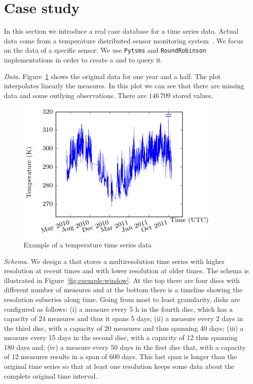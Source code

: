 
\section{Case study}
\label{sec:example}

In this section we introduce a real case database for a time series
data. Actual data come from a temperature distributed sensor
monitoring system~\cite{alippi10}. We focus on the data of a specific
sensor. We use \texttt{Pytsms} and \texttt{RoundRobinson}
implementations in order to create a  and to query it.

\emph{Data}. Figure~\ref{fig:exemple:original} shows the original
data for one year and a half. The plot interpolates linearly the
measures. In this plot we can see that there are missing data and some
outlying observations. There are $146\,709$ stored values.

\begin{figure}[tp]
  \centering
  \includegraphics{fig_exemple_original.pdf}
  \caption{Example of a temperature time series data}
  \label{fig:exemple:original}
\end{figure}

\emph{Schema}. We design a  that stores a multiresolution
time series with higher resolution at recent times and with lower
resolution at older times. The schema is illustrated in 
Figure~\ref{fig:exemple:window}. At the top there are four discs with
different number of measures and at the bottom there is a timeline
showing the resolution subseries along time. 
%
Going from most to least granularity, disks are configured as follows:
(i) a measure every 5 h in the fourth disc, which has a capacity of 24
measures and thus it spans 5 days; (ii) a measure every 2 days in the
third disc, with a capacity of 20 measures and thus spanning 40 days;
(iii) a measure every 15 days in the second disc, with a capacity of
12 thus spanning 180 days and; (iv) a measure every 50 days in the
first disc that, with a capacity of 12 measures results in a span of
600 days. This last span is longer than the original time series so
that at least one resolution keeps some data about the complete
original time interval.

